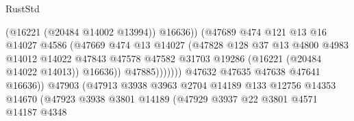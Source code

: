 \begin{lexlean}{RustStd}
\begin{coremodule}
                                                (@16221 (@20484 @14002 @13994))
                                                @16636))
                                            (@47689
                                              @474
                                              @121
                                              @13
                                              @16
                                              @14027
                                              @4586
                                              (@47669
                                                @474
                                                @13
                                                @14027
                                                (@47828
                                                  @128
                                                  @37
                                                  @13
                                                  @4800
                                                  @4983
                                                  @14012
                                                  @14022
                                                  @47843
                                                  @47578
                                                  @47582
                                                  @31703
                                                  @19286
                                                  (@16221 (@20484 @14022 @14013))
                                                  @16636))
                                              @47885)))))))
                                @47632
                                @47635
                                @47638
                                @47641
                                @16636))
                            @47903
                            (@47913
                              @3938
                              @3963
                              @2704
                              @14189
                              @133
                              @12756
                              @14353
                              @14670
                              (@47923
                                @3938
                                @3801
                                @14189
                                (@47929
                                  @3937
                                  @22
                                  @3801
                                  @4571
                                  @14187
                                  @4348

\end{coremodule}
\end{lexlean}
